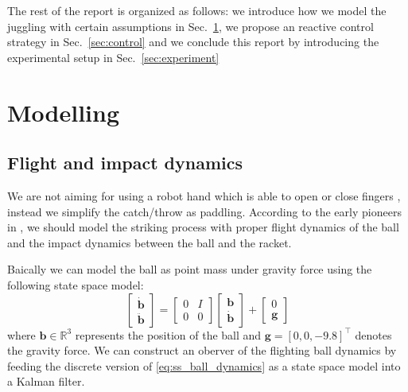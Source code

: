 \documentclass[letterpaper, 10 pt, conference]{ieeeconf}  %
\newcommand{\bs}{\boldsymbol}
\begin{document}


The rest of the report is organized as follows: we introduce how we model the juggling with certain assumptions in Sec.~\ref{sec:modelling}, we propose an reactive control strategy in  Sec.~\ref{sec:control} and we conclude this report by introducing the experimental setup in Sec.~\ref{sec:experiment}






   



\section{Modelling}
\label{sec:modelling}

\subsection{Flight and impact dynamics }
\label{sec:dynamics}
We are not aiming for using a robot hand which is able to open or close  fingers \cite{kober2012playing}, instead we simplify the catch/throw as paddling.   
According to the early pioneers in \cite{rizzi1992distributed}, 
we should model the
striking process with proper flight dynamics of the ball and the impact dynamics
between the ball and the racket. 

Baically we can model the ball as point mass under gravity force using the following state space model: 
\begin{equation}
\label{eq:ss_ball_dynamics}
\begin{bmatrix}
  \dot{\bs{b}}\\ 
  \ddot{\bs{b}}
\end{bmatrix}
=
 \begin{bmatrix}
       0 & I           \\[0.3em]
       0 & 0
     \end{bmatrix}
\begin{bmatrix}
  \bs{b}\\ 
  \dot{\bs{b}} 
\end{bmatrix}
+
\begin{bmatrix}
  0\\ 
  \bs{g}
\end{bmatrix}
\end{equation}
where $\bs{b}\in\mathbb{R}^3$ represents the position of the ball and $\bs{g} = [ 0, 0, -9.8]^\top$ denotes the gravity force. 
We can construct an oberver of the flighting ball dynamics by feeding the discrete version of \eqref{eq:ss_ball_dynamics} as a state space model into a Kalman filter.  
\end{document}
